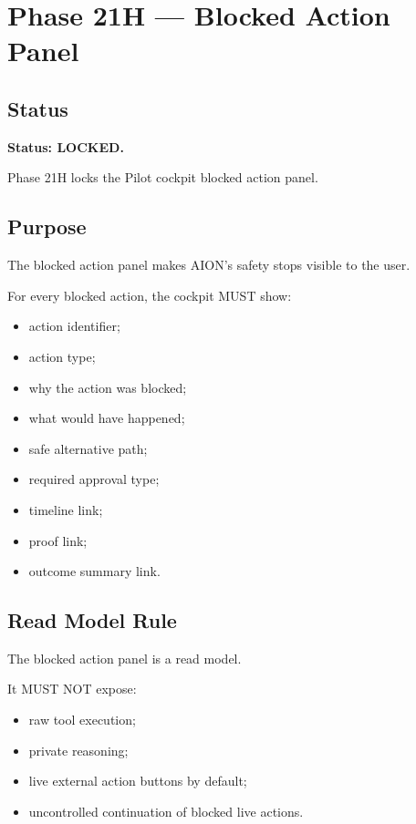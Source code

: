 \section{Phase 21H --- Blocked Action Panel}
\label{sec:aion-phase21h-blocked-action-panel}

\subsection{Status}

\textbf{Status: LOCKED.}

Phase 21H locks the Pilot cockpit blocked action panel.

\subsection{Purpose}

The blocked action panel makes AION's safety stops visible to the user.

For every blocked action, the cockpit MUST show:

\begin{itemize}
  \item action identifier;
  \item action type;
  \item why the action was blocked;
  \item what would have happened;
  \item safe alternative path;
  \item required approval type;
  \item timeline link;
  \item proof link;
  \item outcome summary link.
\end{itemize}

\subsection{Read Model Rule}

The blocked action panel is a read model.

It MUST NOT expose:

\begin{itemize}
  \item raw tool execution;
  \item private reasoning;
  \item live external action buttons by default;
  \item uncontrolled continuation of blocked live actions.
\end{itemize}

